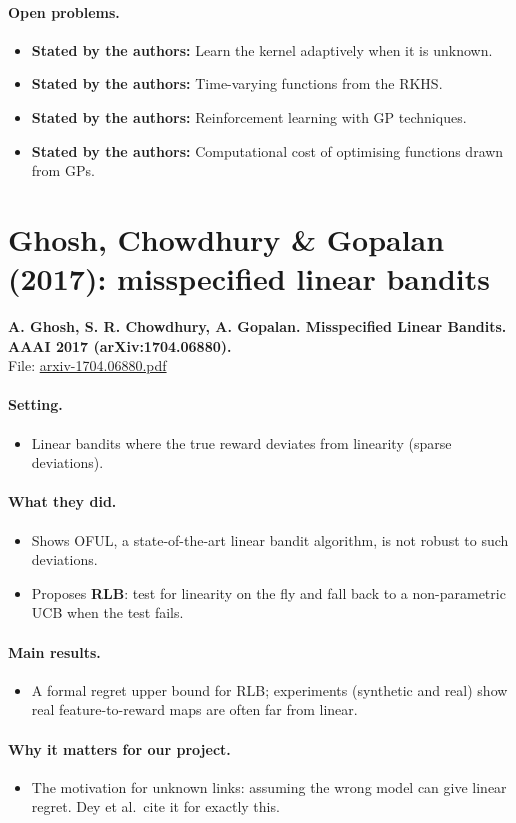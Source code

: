 \documentclass[11pt]{article}
\newcommand{\stated}{\textcolor{green!40!black}{\textbf{Stated by the authors:}}}
\newcommand{\file}[1]{\url{#1}}
\begin{document}
\paragraph{Open problems.}
\begin{itemize}\item \stated{} Learn the kernel adaptively when it is unknown.\item \stated{} Time-varying functions from the RKHS.\item \stated{} Reinforcement learning with GP techniques.\item \stated{} Computational cost of optimising functions drawn from GPs.\end{itemize}
\section{Ghosh, Chowdhury \& Gopalan (2017): misspecified linear bandits}
\textbf{A. Ghosh, S. R. Chowdhury, A. Gopalan. Misspecified Linear Bandits. AAAI 2017 (arXiv:1704.06880).}\\ File: \file{arxiv-1704.06880.pdf}
\paragraph{Setting.}
\begin{itemize}\item Linear bandits where the true reward deviates from linearity (sparse deviations).\end{itemize}
\paragraph{What they did.}
\begin{itemize}\item Shows OFUL, a state-of-the-art linear bandit algorithm, is not robust to such deviations.\item Proposes \textbf{RLB}: test for linearity on the fly and fall back to a non-parametric UCB when the test fails.\end{itemize}
\paragraph{Main results.}
\begin{itemize}\item A formal regret upper bound for RLB; experiments (synthetic and real) show real feature-to-reward maps are often far from linear.\end{itemize}
\paragraph{Why it matters for our project.}
\begin{itemize}\item The motivation for unknown links: assuming the wrong model can give linear regret. Dey et al.\ cite it for exactly this.\end{itemize}
\end{document}
